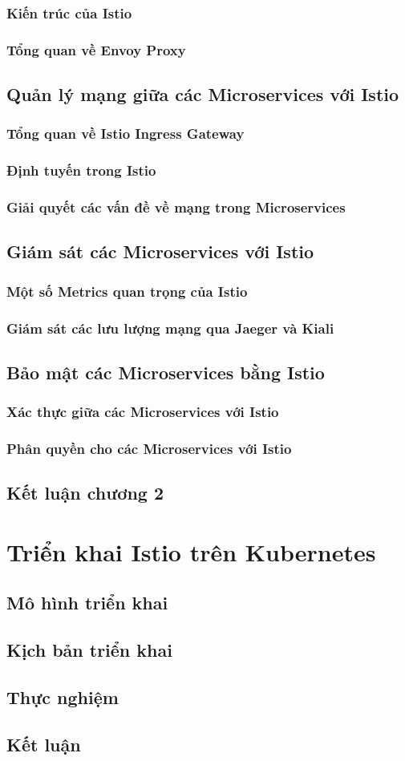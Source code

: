 \documentclass[12pt,a4paper]{report}
\begin{document}
			\subsection{Kiến trúc của Istio}
		\subsection{Tổng quan về Envoy Proxy}
		\section{Quản lý mạng giữa các Microservices với Istio}
			\subsection{Tổng quan về Istio Ingress Gateway}
			\subsection{Định tuyến trong Istio}
			\subsection{Giải quyết các vấn đề về mạng trong Microservices}
		\section{Giám sát các Microservices với Istio}
			\subsection{Một số Metrics quan trọng của Istio}
			\subsection{Giám sát các lưu lượng mạng qua Jaeger và Kiali}
		\section{Bảo mật các Microservices bằng Istio}
			\subsection{Xác thực giữa các Microservices với Istio}
			\subsection{Phân quyền cho các Microservices với Istio}
		\section*{Kết luận chương 2}
	\chapter{Triển khai Istio trên Kubernetes}
		\section{Mô hình triển khai}
		\section{Kịch bản triển khai}
		\section{Thực nghiệm}
		\section{Kết luận}
	
\end{document}
